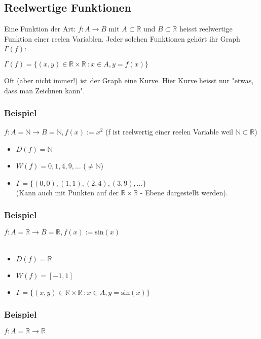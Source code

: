 \documentclass[11pt]{article} %
\begin{document}
\subsection{Reelwertige Funktionen}
Eine Funktion der Art: $f: A \rightarrow B$ mit $A \subset \mathbb{R}$ und $B \subset \mathbb{R}$ heisst reelwertige Funktion einer reelen Variablen. Jeder solchen Funktionen gehört ihr Graph $\Gamma (f)$:

\begin{center}
$\Gamma(f) = \{ (x,y) \in \mathbb{R} \times  \mathbb{R}\ : x\in A, y = f(x)\}$
\end{center}

Oft (aber nicht immer!) ist der Graph eine Kurve. Hier Kurve heisst nur "etwas, dass man Zeichnen kann".

\subsubsection{Beispiel}
$f: A = \mathbb{N} \rightarrow B = \mathbb{N}, f(x) := x^2$ (f ist reelwertig einer reelen Variable weil $\mathbb{N} \subset \mathbb{R}$)

\begin{itemize}
\item $D(f) = \mathbb{N}$
\item $W(f) = {0,1,4,9,...}$ ($\neq \mathbb{N}$)
\item $\Gamma= \{(0,0),(1,1),(2,4),(3,9),...\}$ \\
(Kann auch mit Punkten auf der $\mathbb{R} \times \mathbb{R}$ - Ebene dargestellt werden).
\end{itemize}

\subsubsection{Beispiel}
$f: A=\mathbb{R} \rightarrow B=\mathbb{R}, f(x) := \mathrm{sin}(x)$\\\\
\begin{itemize}
\item $D(f) = \mathbb{R}$
\item $W(f) = [-1,1]$
\item $\Gamma = \{(x,y) \in \mathbb{R} \times  \mathbb{R}\ : x\in A, y = \mathrm{sin}(x)\}$
\end{itemize}

\subsubsection{Beispiel}
$f: A=\mathbb{R} \rightarrow \mathbb{R}$\\
\end{document}
